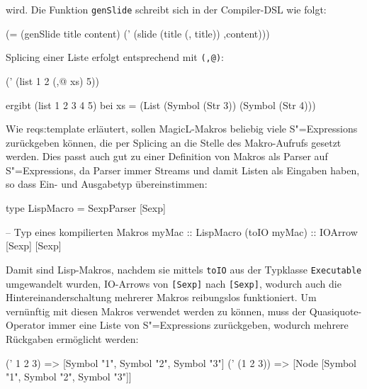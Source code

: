 \documentclass[12pt, a4paper, bibgerm]{scrbook}
\newenvironment{DIFnomarkup}{}{}
\newcommand\icode[1]{\lstinline?#1?}
\newcommand\sref{}
\newcommand{\sexps}{S"=Expressions}
\begin{document}
wird. Die Funktion \icode{genSlide} schreibt sich in der Compiler-DSL wie
folgt:
\begin{DIFnomarkup}\begin{code}
(= (genSlide title content)
   (' (slide (title (, title)) ,content)))
\end{code}\end{DIFnomarkup}
Splicing einer Liste erfolgt entsprechend mit \icode{(,@)}:
\begin{DIFnomarkup}\begin{code}
(' (list 1 2 (,@ xs) 5))

ergibt (list 1 2 3 4 5) bei xs = (List (Symbol (Str 3))
                                       (Symbol (Str 4)))
\end{code}\end{DIFnomarkup}
Wie \sref{reqs:template} erläutert, sollen MagicL-Makros beliebig viele
\sexps{} zurückgeben können, die per Splicing an die Stelle des
Makro-Aufrufs gesetzt werden. Dies passt auch gut zu einer Definition
von Makros als Parser auf \sexps{}, da Parser immer Streams und damit
Listen als Eingaben haben, so dass Ein- und Ausgabetyp übereinstimmen:
\begin{DIFnomarkup}\begin{code}
type LispMacro = SexpParser [Sexp]

-- Typ eines kompilierten Makros
myMac        :: LispMacro
(toIO myMac) :: IOArrow [Sexp] [Sexp]
\end{code}\end{DIFnomarkup}
Damit sind Lisp-Makros, nachdem sie mittels \icode{toIO} aus der Typklasse
\icode{Executable} umgewandelt wurden, IO-Arrows von \icode{[Sexp]} nach
\icode{[Sexp]}, wodurch auch die Hintereinanderschaltung mehrerer
Makros reibungslos funktioniert. Um vernünftig mit diesen Makros
verwendet werden zu können, muss der Quasiquote-Operator immer eine
Liste von \sexps{} zurückgeben, wodurch mehrere Rückgaben ermöglicht
werden:
\begin{DIFnomarkup}\begin{code}
(' 1 2 3)     =>   [Symbol "1", Symbol "2", Symbol "3"]
(' (1 2 3))   =>   [Node [Symbol "1", Symbol "2", Symbol "3"]]
\end{code}\end{DIFnomarkup}
\end{document}
